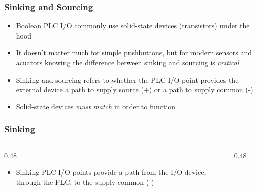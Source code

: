 \begin{frame}
    \frametitle{Sinking and Sourcing}

    \begin{itemize}
        \item Boolean PLC I/O commonly use solid-state devices (transistors) under the hood
        \item It doesn't matter much for simple pushbuttons, but for modern sensors and acuators knowing the difference between sinking and sourcing is \emph{critical}
        \item Sinking and sourcing refers to whether the PLC I/O point provides the external device a path to supply source (+) or a path to supply common (-)
        \item Solid-state devices \emph{must match} in order to function
    \end{itemize}
\end{frame}

\begin{frame}
    \frametitle{Sinking}

    \begin{columns}
        \begin{column}{0.48\linewidth}
            \begin{itemize}
                \item Sinking PLC I/O points provide a path from the I/O device, through the PLC, to the supply common (-)
            \end{itemize}
        \end{column}
        \begin{column}{0.48\linewidth}
            \begin{figure}
                \centering
                \resizebox{0.75\columnwidth}{!}{
                    
                }
            \end{figure}
            
            \vspace{0.5em}

            \begin{figure}
                \centering
                \resizebox{0.75\columnwidth}{!}{
                    
                }
            \end{figure}
        \end{column}
    \end{columns}    
\end{frame}

